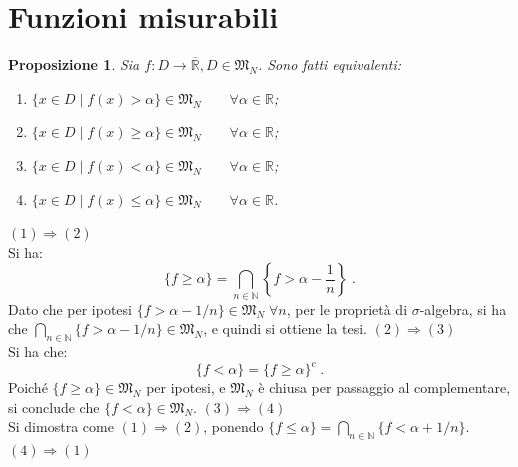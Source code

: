 \documentclass[a4paper,12pt]{report}
\theoremstyle{plain}
\newtheorem{prop}{Proposizione}[section]
\theoremstyle{definition}
\theoremstyle{remark}
\numberwithin{equation}{section}
\begin{document}
\section{Funzioni misurabili}
\begin{prop} Sia $f:D\to \overline{\mathbb{R}}, D\in \mathfrak{M}_N$. Sono fatti equivalenti:
\begin{enumerate}
 \item $\{x \in D\;|\; f(x)>\alpha\}\in \mathfrak{M}_N \qquad \forall \alpha \in \mathbb{R}$;
 \item $\{x \in D\;|\; f(x)\ge\alpha\}\in \mathfrak{M}_N \qquad \forall \alpha \in \mathbb{R}$;
 \item $\{x \in D\;|\; f(x)<\alpha\}\in \mathfrak{M}_N \qquad \forall \alpha \in \mathbb{R}$;
 \item $\{x \in D\;|\; f(x)\le\alpha\}\in \mathfrak{M}_N \qquad \forall \alpha \in \mathbb{R}$.
\end{enumerate}
\end{prop}
\proof $(1) \Longrightarrow (2)$ \\

Si ha:
\begin{equation}
\{f \ge \alpha\}=\bigcap_{n\in \mathbb{N}} \left\{f>\alpha-\frac{1}{n}\right\}\;.
\end{equation}
Dato che per ipotesi $\{f>\alpha-1/n\}\in \mathfrak{M}_N \;\forall n$, per le proprietà di $\sigma$-algebra, si ha che $\bigcap_{n\in
\mathbb{N}}\{f>\alpha-1/n\}\in\mathfrak{M}_N$, e quindi si ottiene la tesi.
\endproof
\proof $(2) \Longrightarrow (3)$ \\

Si ha che:
\begin{equation}
\{f<\alpha\}=\{f\ge \alpha\}^c\;.
\end{equation}
Poiché $\{f\ge \alpha\} \in \mathfrak{M}_N$ per ipotesi, e $\mathfrak{M}_N$ è chiusa per passaggio al complementare, si conclude che $\{f<\alpha\}\in\mathfrak{M}_N$.
\endproof
\proof $(3) \Longrightarrow (4)$ \\

Si dimostra come $(1) \Longrightarrow (2)$, ponendo $\{f\le\alpha\}=\bigcap_{n\in\mathbb{N}}\{f<\alpha+1/n\}$.
\endproof
\proof $(4) \Longrightarrow (1)$ \\
\end{document}
